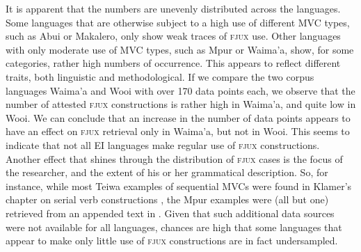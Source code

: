 It is apparent that the numbers are unevenly distributed across the languages. Some languages that are otherwise subject to a high use of different MVC types, such as Abui or Makalero, only show weak traces of \textsc{fjux} use. Other languages with only moderate use of MVC types, such as Mpur or Waima'a, show, for some categories, rather high numbers of occurrence. This appears to reflect different traits, both linguistic and methodological. If we compare the two corpus languages Waima'a and Wooi with over 170 data points each, we observe that the number of attested \textsc{fjux} constructions is rather high in Waima'a, and quite low in Wooi. We can conclude that an increase in the number of data points appears to have an effect on \textsc{fjux} retrieval only in Waima'a, but not in Wooi. This seems to indicate that not all EI languages make regular use of \textsc{fjux} constructions. Another effect that shines through the distribution of \textsc{fjux} cases is the focus of the researcher, and the extent of his or her grammatical description. So, for instance, while most Teiwa examples of sequential MVCs were found in Klamer's chapter on serial verb constructions \citep{klamer2010grammar}, the Mpur examples were (all but one) retrieved from an appended text in \citet{ode2002sketch}. Given that such additional data sources were not available for all languages, chances are high that some languages that appear to make only little use of \textsc{fjux} constructions are in fact undersampled.

